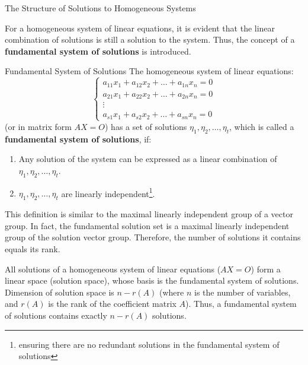 \documentclass[11pt]{../../TexTemplate/elegantbook} %
\begin{document}
\begin{leftbarTitle}{The Structure of Solutions to Homogeneous Systems}\end{leftbarTitle}
For a homogeneous system of linear equations, 
it is evident that the linear combination of solutions is still a solution to the system. 
Thus, the concept of a \textbf{fundamental system of solutions} is introduced.

\begin{definition}{Fundamental System of Solutions}
    The homogeneous system of linear equations:
    \[
    \begin{cases}
    a_{11}x_{1} + a_{12}x_{2} + \dots + a_{1n}x_{n} = 0 \\
    a_{21}x_{1} + a_{22}x_{2} + \dots + a_{2n}x_{n} = 0 \\
    \vdots \\
    a_{s1}x_{1} + a_{s2}x_{2} + \dots + a_{sn}x_{n} = 0
    \end{cases}
    \]
    (or in matrix form \( AX = O \))
    has a set of solutions \( \eta_{1}, \eta_{2}, \dots, \eta_{t} \), which is called a \textbf{fundamental system of solutions}, 
    if:
    \begin{enumerate}
        \item Any solution of the system can be expressed as a linear combination of \( \eta_{1}, \eta_{2}, \dots, \eta_{t} \).
        \item \( \eta_{1}, \eta_{2}, \dots, \eta_{t} \) are linearly independent\footnote{
            ensuring there are no redundant solutions in the fundamental system of solutions
        }.
    \end{enumerate}
\end{definition}

\begin{remark}
    This definition is similar to the maximal linearly independent group of a vector group. 
    In fact, the fundamental solution set is a maximal linearly independent group of the solution vector group. 
    Therefore, the number of solutions it contains equals its rank.
\end{remark}


\vspace{0.7cm}
All solutions of a homogeneous system of linear equations (\( AX = O \)) form a linear space (solution space),
whose basis is the fundamental system of solutions.
Dimension of solution space is \( n - r(A) \) (where \( n \) is the number of variables, 
and \( r(A) \) is the rank of the coefficient matrix \( A \)). 
Thus, a fundamental system of solutions contains exactly \( n - r(A) \) solutions.
    
\end{document}
